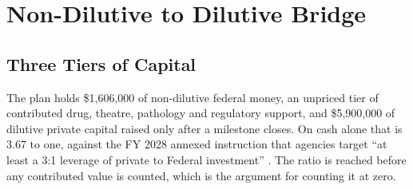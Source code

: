 \section{Non-Dilutive to Dilutive Bridge}

\subsection{Three Tiers of Capital}

The plan holds \$1,606,000 of non-dilutive federal money, an unpriced tier of
contributed drug, theatre, pathology and regulatory support, and \$5,900,000 of
dilutive private capital raised only after a milestone closes. On cash alone
that is 3.67 to one, against the FY 2028 annexed instruction that agencies
target ``at least a 3:1 leverage of private to Federal investment''
\cite{kratsiosvought2026fy2028priorities}. The ratio is reached before any
contributed value is counted, which is the argument for counting it at zero.

